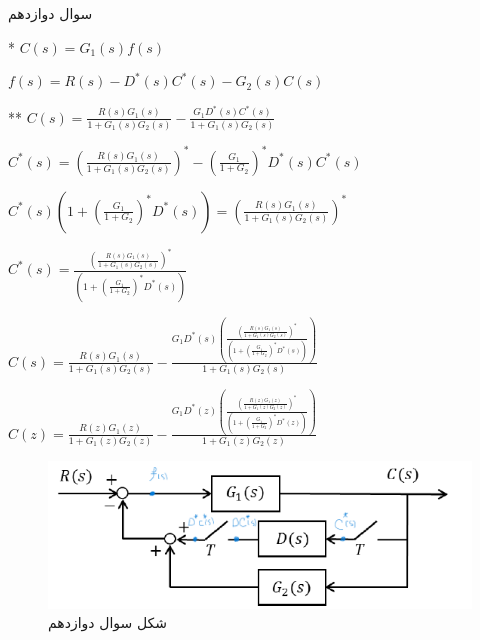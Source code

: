 \documentclass{article}
\begin{document}
\begin{problem}{سوال دوازدهم}
	\raggedleft
	
	* $C(s) = G_1(s) f(s)$
	
	$f(s) = R(s) -D^*(s)C^*(s) - G_2(s)C(s)$
	
	** $C(s) = \frac{R(s)G_1(s)}{1+G_1(s)G_2(s)} - \frac{G_1D^*(s)C^*(s)}{1+G_1(s)G_2(s)}$
	
	$C^*(s) = (\frac{R(s)G_1(s)}{1+G_1(s)G_2(s)})^* - (\frac{G_1}{1+G_2})^* D^*(s)C^*(s) $
	
	$C^*(s)(1 + (\frac{G_1}{1+G_2})^* D^*(s)) = (\frac{R(s)G_1(s)}{1+G_1(s)G_2(s)})^*$
	
	$C^*(s) = \frac{(\frac{R(s)G_1(s)}{1+G_1(s)G_2(s)})^*}{(1 + (\frac{G_1}{1+G_2})^* D^*(s))}$
	
	
	$C(s) = \frac{R(s)G_1(s)}{1+G_1(s)G_2(s)} - \frac{G_1D^*(s)(\frac{(\frac{R(s)G_1(s)}{1+G_1(s)G_2(s)})^*}{(1 + (\frac{G_1}{1+G_2})^* D^*(s))})}{1+G_1(s)G_2(s)} $
	
	
	$C(z) = \frac{R(z)G_1(z)}{1+G_1(z)G_2(z)} - \frac{G_1D^*(z)(\frac{(\frac{R(z)G_1(z)}{1+G_1(z)G_2(z)})^*}{(1 + (\frac{G_1}{1+G_2})^* D^*(z))})}{1+G_1(z)G_2(z)} $
	
	
\end{problem}
\begin{figure}
	\includegraphics[width=\linewidth]{Second Series/6.png}
	\caption{شکل سوال دوازدهم}
\end{figure}
\end{document}
